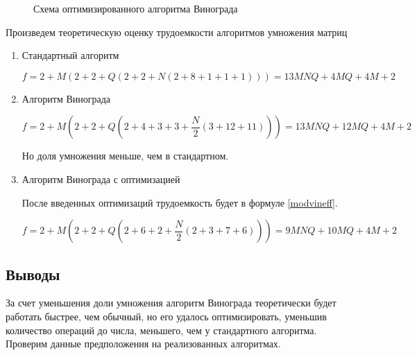 \begin{figure}[H]
    \caption{Схема оптимизированного алгоритма Винограда}
    \label{img:modvinograd}
\end{figure}

Произведем теоретическую оценку трудоемкости алгоритмов умножения матриц

\begin{enumerate}
    \item Стандартный алгоритм

        \begin{equation}
            f = 2 + M(2 + 2 + Q(2 + 2 + N(2 + 8 + 1 + 1 + 1))) =
            13MNQ + 4MQ + 4M + 2
        \end{equation}

    \item Алгоритм Винограда

        \begin{equation}
            f = 2 + M(2 + 2 + Q(2 + 4 + 3 + 3 + \frac{N}{2}(3 + 12 + 11))) =
            13MNQ + 12MQ + 4M + 2
        \end{equation}

        Но доля умножения меньше, чем в стандартном.

    \item Алгоритм Винограда с оптимизацией

        После введенных оптимизаций трудоемкость будет в формуле \ref{modvineff}.

        \begin{equation}\label{modvineff}
            f = 2 + M(2 + 2 + Q(2 + 6 + 2 + \frac{N}{2}(2 + 3 + 7 + 6))) =
            9MNQ + 10MQ + 4M + 2
        \end{equation}
\end{enumerate}

\subsection{Выводы}

За счет уменьшения доли умножения алгоритм Винограда теоретически будет работать быстрее,
чем обычный, но его удалось оптимизировать, уменьшив количество операций до числа,
меньшего, чем у стандартного алгоритма. Проверим данные предположения на реализованных
алгоритмах.
